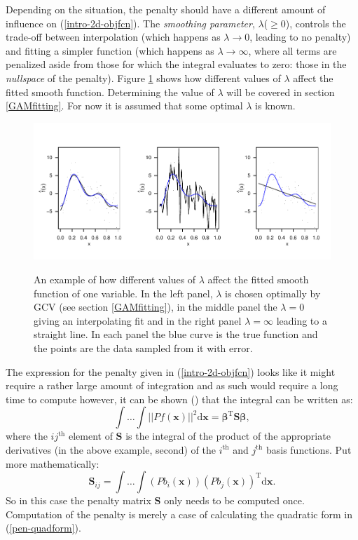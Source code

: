 Depending on the situation, the penalty should have a different amount of influence on (\ref{intro-2d-objfcn}). The \textit{smoothing parameter}, $\lambda$($\geq0$), controls the trade-off between interpolation (which happens as $\lambda \rightarrow 0$, leading to no penalty) and fitting a simpler function (which happens as $\lambda \rightarrow \infty$, where all terms are penalized aside from those for which the integral evaluates to zero: those in the \textit{nullspace} of the penalty). Figure \ref{lambda-ex} shows how different values of $\lambda$ affect the fitted smooth function. Determining the value of $\lambda$ will be covered in section \ref{GAMfitting}. For now it is assumed that some optimal $\lambda$ is known.

\begin{figure}[tb]
\centering
\includegraphics[width=6in]{intro/figs/lambda-ex.pdf}\\
\caption{An example of how different values of $\lambda$ affect the fitted smooth function of one variable. In the left panel, $\lambda$ is chosen optimally by GCV (see section \ref{GAMfitting}), in the middle panel the $\lambda=0$ giving an interpolating fit and in the right panel $\lambda=\infty$ leading to a straight line. In each panel the blue curve is the true function and the points are the data sampled from it with error.}
\label{lambda-ex}
\end{figure}

The expression for the penalty given in (\ref{intro-2d-objfcn}) looks like it might require a rather large amount of integration and as such would require a long time to compute however, it can be shown (\cite[p. 128]{simonbook}) that the integral can be written as:
\begin{equation}
\int \dots \int \lvert \lvert P f(\mathbf{x}) \rvert \rvert^2 \text{d}\mathbf{x} = \bm{\beta}^\text{T} \mathbf{S} \bm{\beta},
\label{pen-quadform}
\end{equation}
where the $ij^\text{th}$ element of $\mathbf{S}$ is the integral of the product of the appropriate derivatives (in the above example, second) of the $i^\text{th}$ and $j^\text{th}$ basis functions. Put more mathematically:
\begin{equation*}
\mathbf{S}_{ij} = \int \dots \int \left(Pb_{i}(\mathbf{x})\right ) \left (Pb_{j}(\mathbf{x}) \right )^\text{T}  \text{d}\mathbf{x}.
\end{equation*}
So in this case the penalty matrix $\mathbf{S}$ only needs to be computed once. Computation of the penalty is merely a case of calculating the quadratic form in (\ref{pen-quadform}).

